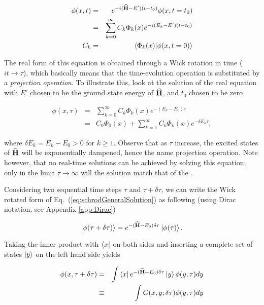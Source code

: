 \begin{eqnarray}
 \phi(x, t) &=& e^{-i({\bf\widehat{H}} - E')(t-t_0)}\phi(x, t=t_0) \label{eq:schrodGeneralSolution} \\
            &=& \sum_{k=0}^{\infty} C_k\Phi_k(x)e^{-i(E_k - E')(t-t_0)} \label{eq:realSchrod} \\
 C_k &=& \left\langle \Phi_k(x) | \phi(x, t=0)\right\rangle \nonumber
 \end{eqnarray}


The real form of this equation is obtained through a Wick rotation in time ($it \rightarrow \tau$), which basically means that the time-evolution operation is substituted by a \textit{projection operation}. To illustrate this, look at the solution of the real equation with $E'$ chosen to be the ground state energy of ${\bf\widehat{H}}$, and $t_0$ chosen to be zero

\begin{eqnarray}
 \phi(x, \tau) &=& \sum_{k=0}^{\infty} C_k\Phi_k(x)e^{-(E_k - E_0)\tau} \\
                    &=& C_0\Phi_0(x) + \sum_{k=1}^{\infty} C_k\Phi_k(x)e^{-\delta E_k\tau}, \nonumber
\end{eqnarray}

where $\delta E_k = E_k - E_0 > 0$ for $k \ge 1$. Observe that as $\tau$ increase, the excited states of ${\bf\widehat{H}}$ will be exponentially dampened, hence the name projection operation. Note however, that no real-time solutions can be achieved by solving this equation; only in the limit $\tau\rightarrow\infty$ will the solution match that of the \schrodinger. 

Considering two sequential time steps $\tau$ and $\tau + \delta\tau$, we can write the Wick rotated form of Eq.~(\ref{eq:schrodGeneralSolution}) as following (using Dirac notation, see Appendix \ref{app:Dirac})

\begin{equation*}
 \left| \phi(\tau + \delta\tau) \right> = e^{-({\bf\widehat{H}} - E_0)\delta\tau}\left| \phi(\tau) \right>.
\end{equation*}

Taking the inner product with $\left< x \right|$ on both sides and inserting a complete set of states $\left| y \right>$ on the left hand side yields

\begin{eqnarray*}
 \phi(x, \tau + \delta\tau) &=& \int \left< x \right|e^{-({\bf\widehat{H}} - E_0)\delta\tau}\left| y \right>\phi(y, \tau)dy \\
			     &\equiv& \int G(x, y; \delta\tau)\phi(y, \tau)dy
\end{eqnarray*}

